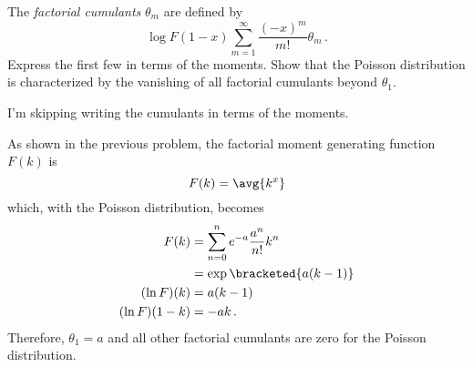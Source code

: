 

The \emph{factorial cumulants} $\theta_m$ are defined by
\begin{equation*}
\log F(1 - x) \sum_{m=1}^\infty \frac{(-x)^m}{m!} \theta_m \, .
\end{equation*}
Express the first few in terms of the moments.
Show that the Poisson distribution is characterized by the vanishing of all factorial cumulants beyond $\theta_1$.


I'm skipping writing the cumulants in terms of the moments.

As shown in the previous problem, the factorial moment generating function $F(k)$ is
\begin{equation*}
F(k) = \avg{k^x}
\end{equation*}
which, with the Poisson distribution, becomes
\begin{align*}
F(k)
&= \sum_{n=0}^n e^{-a} \frac{a^n}{n!} k^n \\
&= \exp \bracketed{a(k-1)} \\
(\ln F)(k)
&= a (k - 1) \\
(\ln F)(1 - k)
&= -a k \, .
\end{align*}
Therefore, $\theta_1 = a$ and all other factorial cumulants are zero for the Poisson distribution.
